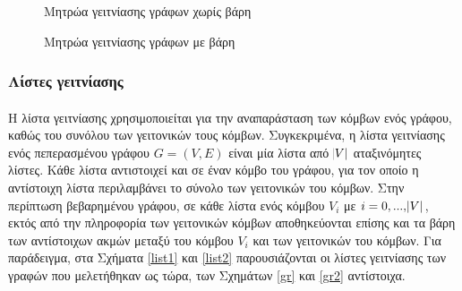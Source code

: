 \documentclass[12pt,twoside]{article}
\newcommand{\gr}{\selectlanguage{greek}}
\begin{document}
\gr
\begin{figure}[h]
\centering
{}
	\hfil
\caption{Μητρώα γειτνίασης γράφων χωρίς βάρη}
 \label{mat1}
\end{figure}
\begin{figure}[!t]
\centering
{}
	\hfil
\caption{Μητρώα γειτνίασης γράφων με βάρη}
 \label{mat2}
\end{figure}

\setcounter{subfigure}{0}
\gr


\subsubsection{\gr Λίστες γειτνίασης}
\paragraph{}
Η λίστα γειτνίασης χρησιμοποιείται για την αναπαράσταση των κόμβων ενός γράφου, καθώς του συνόλου των γειτονικών τους κόμβων. Συγκεκριμένα, η λίστα γειτνίασης ενός πεπερασμένου γράφου $G=(V,E)$ είναι μία λίστα από $\abs{V}$ αταξινόμητες λίστες. Κάθε λίστα αντιστοιχεί και σε έναν κόμβο του γράφου, για τον οποίο η αντίστοιχη λίστα περιλαμβάνει το σύνολο των γειτονικών του κόμβων.  Στην περίπτωση βεβαρημένου γράφου, σε κάθε λίστα ενός κόμβου $V_i$ με $i=0,...,\abs{V}$, εκτός από την πληροφορία των γειτονικών κόμβων αποθηκεύονται επίσης και τα βάρη των αντίστοιχων ακμών μεταξύ του κόμβου $V_i$ και των γειτονικών του κόμβων. Για παράδειγμα, στα Σχήματα \ref{list1} και \ref{list2} παρουσιάζονται οι λίστες γειτνίασης των γραφών που μελετήθηκαν ως τώρα, των Σχημάτων \ref{gr} και \ref{gr2} αντίστοιχα. 
\end{document}
